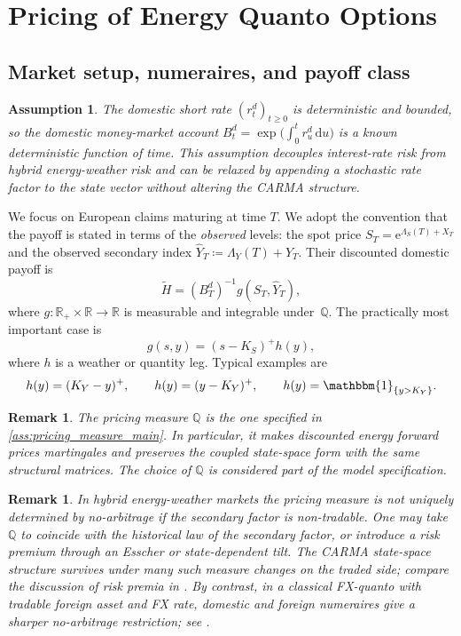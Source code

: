 \documentclass[10pt,a4paper,reqno]{amsart}
\newtheorem{remark}[theorem]{Remark}
\newtheorem{assumption}[theorem]{Assumption}
\newcommand{\R}{\mathbb{R}}
\newcommand{\Q}{\mathbb{Q}}
\newcommand{\1}{\mathbbm{1}}
\newcommand{\dd}{\mathrm{d}}
\newcommand{\ee}{\mathrm{e}}
\begin{document}
\section{Pricing of Energy Quanto Options}\label{sec:pricing-quanto-options}

\subsection{Market setup, numeraires, and payoff class}

\begin{assumption}\label{ass:interest_rate}
The domestic short rate \((r_t^d)_{t \ge 0}\) is deterministic and bounded,
so the domestic money-market account
\(B_t^d = \exp\!\bigl(\int_0^t r_u^d\,\dd u\bigr)\) is a known deterministic
function of time. This assumption decouples interest-rate risk from hybrid
energy-weather risk and can be relaxed by appending a stochastic rate factor to
the state vector without altering the CARMA structure.
\end{assumption}

We focus on European claims maturing at time \(T\). We adopt the convention
that the payoff is stated in terms of the \emph{observed} levels: the spot
price \(S_T = \ee^{\Lambda_S(T)+X_T}\) and the observed secondary index
\(\widehat{Y}_T \coloneqq \Lambda_Y(T)+Y_T\). Their discounted domestic payoff
is
\[
\widetilde{H}
= (B_T^d)^{-1} g(S_T,\widehat{Y}_T),
\]
where \(g:\R_+ \times \R \to \R\) is measurable and integrable under~\(\Q\).
The practically most important case is
\begin{equation}\label{eq:quanto_payoff_general}
  g(s,y) = (s-K_S)^+ h(y),
\end{equation}
where \(h\) is a weather or quantity leg. Typical examples are
\[
h(y) = (K_Y-y)^+,\qquad
h(y) = (y-K_Y)^+,\qquad
h(y) = \1_{\{y>K_Y\}}.
\]

\begin{remark}
The pricing measure \(\Q\) is the one specified in
\ref{ass:pricing_measure_main}. In particular, it
makes discounted energy forward prices martingales and preserves the coupled
state-space form with the same structural matrices. The choice of \(\Q\) is
considered part of the model specification.
\end{remark}

\begin{remark}
In hybrid energy-weather markets the pricing measure is not uniquely
determined by no-arbitrage if the secondary factor is non-tradable. One may
take \(\Q\) to coincide with the historical law of the secondary factor, or
introduce a risk premium through an Esscher or state-dependent tilt. The
CARMA state-space structure survives under many such measure changes on the
traded side; compare the discussion of risk premia in \citet{Ben14}. By
contrast, in a classical FX-quanto with tradable foreign asset and FX rate,
domestic and foreign numeraires give a sharper no-arbitrage restriction; see
\citet{Hul21}.
\end{remark}
\end{document}
